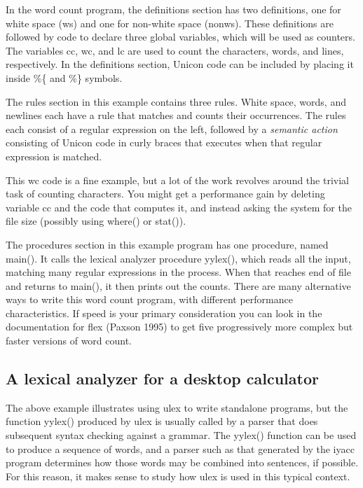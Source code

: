 In the word count program, the definitions section has two definitions,
one for white space (\textsf{ws}) and one for non-white space
(\textsf{nonws}). These definitions are followed by code to declare
three global variables, which will be used as counters. The variables
\textsf{cc}, \textsf{wc}, and \textsf{lc} are used to count the
characters, words, and lines, respectively. In the definitions
section, Unicon code can be included by placing it inside \%\{
and \%\} symbols.

The rules section in this example contains three rules. White space,
words, and newlines each have a rule that matches and counts their
occurrences. The rules each consist of a regular expression on the
left, followed by a {\em semantic action\/} consisting of Unicon code
in curly braces that executes when that regular expression is matched.

This \textsf{wc} code is a fine example, but a lot of the work
revolves around the trivial task of counting characters. You might
get a performance gain by deleting variable cc and the code that
computes it, and instead asking the system for the file size (possibly
using \textsf{where()} or \textsf{stat()}).

The procedures section in this example program has one procedure,
named \textsf{main()}. It calls the lexical analyzer procedure
yylex(), which reads all the input, matching many regular expressions
in the process. When that reaches end of file and returns to main(),
it then prints out the counts. There are many alternative ways to
write this word count program, with different performance
characteristics. If speed is your primary consideration you can look in
the documentation for \textsf{flex} (Paxson 1995) to get five
progressively more complex but faster versions of word count.

\subsection{A lexical analyzer for a desktop calculator}

The above example illustrates using \textsf{ulex} to write standalone
programs, but the function \textsf{yylex()} produced by \textsf{ulex}
is usually called by a parser that does subsequent syntax checking
against a grammar. The \textsf{yylex()} function
can be used to produce a sequence of words, and a parser such as that
generated by the \textsf{iyacc} program determines how those words may
be combined into sentences, if possible. For this reason, it makes
sense to study how \textsf{ulex} is used in this typical context.

